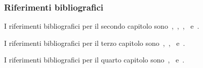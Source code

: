     \subsubsection{Riferimenti bibliografici}
    I riferimenti bibliografici per il secondo capitolo sono~\cite{landaumecc},~\cite{goldstein},~\cite{banados},~\cite{hill} e~\cite{bastianelli}.
    
    I riferimenti bibliografici per il terzo capitolo sono~\cite{banados},~\cite{landaucampi},~\cite{barone} e~\cite{weinberg}.

    I riferimenti bibliografici per il quarto capitolo sono~\cite{banados},~\cite{barone} e~\cite{weinberg}.